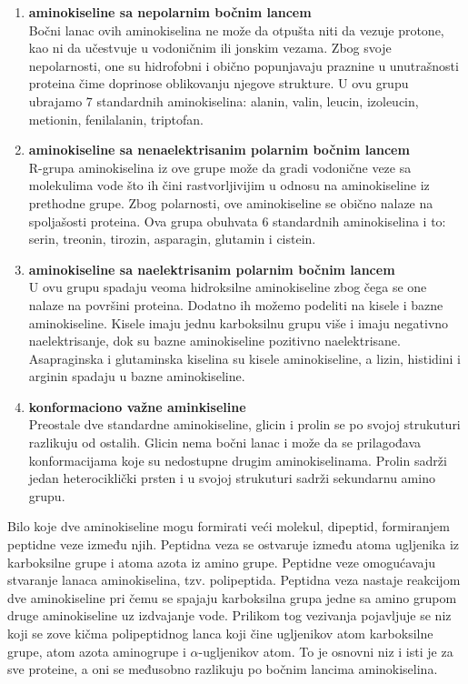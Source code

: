 \begin{enumerate}
	\item \textbf{aminokiseline sa nepolarnim bočnim lancem}\\
	Bočni lanac ovih aminokiselina ne može da otpušta niti da vezuje protone, kao ni da učestvuje u vodoničnim ili jonskim vezama. Zbog svoje nepolarnosti, one su hidrofobni i obično popunjavaju praznine u unutrašnosti proteina čime doprinose oblikovanju njegove strukture. U ovu grupu ubrajamo 7 standardnih aminokiselina: alanin, valin, leucin, izoleucin, metionin, fenilalanin, triptofan. 
	
	\item \textbf{aminokiseline sa nenaelektrisanim polarnim bočnim lancem}\\
	R-grupa aminokiselina iz ove grupe može da gradi vodonične veze sa molekulima vode što ih čini rastvorljivijim u odnosu na aminokiseline iz prethodne grupe. Zbog polarnosti, ove aminokiseline se obično nalaze na spoljašosti proteina. Ova grupa obuhvata 6 standardnih aminokiselina i to: serin, treonin, tirozin, asparagin, glutamin i cistein. 
	
	\item \textbf{aminokiseline sa naelektrisanim polarnim bočnim lancem}\\
	U ovu grupu spadaju veoma hidroksilne aminokiseline zbog čega se one nalaze na površini proteina. Dodatno ih možemo podeliti na kisele i bazne aminokiseline. Kisele imaju jednu karboksilnu grupu više i imaju negativno naelektrisanje, dok su bazne aminokiseline pozitivno naelektrisane. Asapraginska i glutaminska kiselina su kisele aminokiseline, a lizin, histidini i arginin spadaju u bazne aminokiseline.  
	
	\item \textbf{konformaciono važne aminkiseline}\\
	Preostale dve standardne aminokiseline, glicin i prolin se po svojoj strukuturi razlikuju od ostalih. Glicin nema bočni lanac i može da se prilagođava konformacijama koje su nedostupne drugim aminokiselinama. Prolin sadrži jedan heterociklički prsten i u svojoj strukuturi sadrži sekundarnu amino grupu. 
\end{enumerate}



Bilo koje dve aminokiseline mogu formirati veći molekul, dipeptid, formiranjem peptidne veze između njih. Peptidna veza se ostvaruje između atoma ugljenika iz karboksilne grupe i atoma azota iz amino grupe. Peptidne veze omogućavaju stvaranje lanaca aminokiselina, tzv. polipeptida. Peptidna veza nastaje reakcijom dve aminokiseline pri čemu se spajaju karboksilna grupa jedne sa amino grupom druge aminokiseline uz izdvajanje vode. Prilikom tog vezivanja pojavljuje se niz koji se zove kičma polipeptidnog lanca koji čine ugljenikov atom karboksilne grupe, atom azota aminogrupe i $\alpha$-ugljenikov atom. To je osnovni niz i isti je za sve proteine, a oni se međusobno razlikuju po bočnim lancima aminokiselina. \cite{bioinf, biohUdz} 


